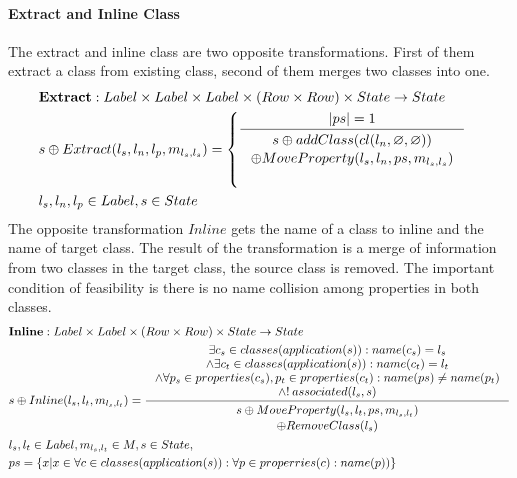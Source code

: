 \documentclass[11pt]{article}
\begin{document}
\paragraph{Extract and Inline Class}
The extract and inline class are two opposite transformations. First of them extract a class from existing class, second of them merges two classes into one.
\begin{align*}
&	\mathbf{Extract} : Label \times Label \times Label \times (Row \times Row) \times State \rightarrow State \\
&	s \oplus Extract(l_s, l_n, l_p, m_{l_s, l_s}) = \begin{cases}
	\inference{|ps| = 1}{\begin{gathered}
		s \oplus addClass(cl(l_n, \varnothing, \varnothing)) \\ \oplus MoveProperty(l_s, l_n, ps, m_{l_s, l_s}) \end{gathered}}\\\\
 \end{cases}
	\\
&	l_s, l_n, l_p \in Label,  s \in State 
\end{align*}
The opposite transformation $Inline$ gets the name of a class to inline and the name of target class. The result of the transformation is a merge of information from two classes in the target class, the source class is removed. The important condition of feasibility is there is no name collision among properties in both classes.
\begin{align*}
&	\mathbf{Inline} : Label \times Label \times (Row \times Row) \times State \rightarrow State \\
&	s \oplus Inline(l_s, l_t, m_{l_s, l_t}) = \inference{\exists c_s \in classes(application(s)) : name(c_s) = l_s \\
\wedge \exists c_t \in classes(application(s)) : name(c_t) = l_t \\
\wedge \forall p_s \in properties(c_s), p_t \in properties(c_t) : name(ps) \neq name(p_t) \\
\wedge !\:associated(l_s, s)   }{\begin{gathered}
	s \oplus MoveProperty(l_s, l_t, ps, m_{l_s, l_t}) \\ \oplus RemoveClass(l_s) 
\end{gathered}
}\\
& l_s, l_t \in Label, m_{l_s, l_t} \in M, s \in State, \\ 
& ps = \{x | x \in \forall c \in classes(application(s)) : \forall p \in properries(c) : name(p))\}
\end{align*}
\end{document}
